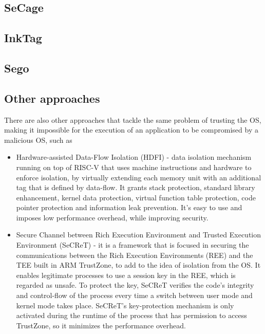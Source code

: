 \subsection{SeCage}
\label{ssec:secage}



\subsection{InkTag}
\label{ssec:inktag}




\subsection{Sego}
\label{ssec:sego}



\subsection{Other approaches}
\label{ssec:tee_other_frameworks}

There are also other approaches that tackle the same problem of trusting the OS, making it impossible for the execution of an  application to be compromised by a malicious OS, such as 

\begin{itemize}
	\item Hardware-assisted Data-Flow Isolation (HDFI) \cite{hdfiPaper} - data isolation mechanism running on top of RISC-V that uses machine instructions and hardware to enforce isolation, by virtually extending each memory unit with an additional tag that is defined by data-flow. It grants stack protection, standard library enhancement, kernel data protection, virtual function table protection, code pointer protection and information leak prevention. It's easy to use and imposes low performance overhead, while improving security.
	
	\item Secure Channel between Rich Execution Environment and Trusted Execution Environment (SeCReT) \cite{secretPaper} - it is a framework that is focused in securing the communications between the Rich Execution Environments (REE) and the TEE built in ARM TrustZone, to add to the idea of isolation from the OS. It enables legitimate processes to use a session key in the REE, which is regarded as unsafe. To protect the key, SeCReT verifies the code's integrity and control-flow of the process every time a switch between user mode and kernel mode takes place. SeCReT's key-protection mechanism is only activated during the runtime of the process that has permission to access TrustZone, so it minimizes the performance overhead.
	
	
\end{itemize}



